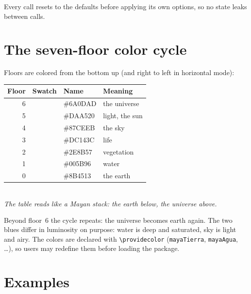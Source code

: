 \documentclass[11pt]{article}
\begin{document}
Every call resets to the defaults before applying its own options, so no
state leaks between calls.

\section{The seven-floor color cycle}

Floors are colored from the bottom up (and right to left in horizontal mode):

\begin{center}
	\begin{tabular}{rlll}
		\textbf{Floor} & \textbf{Swatch} & \textbf{Name} & \textbf{Meaning}\\\hline
		6 & \colorbox{mayaUniverso}{\strut\hspace{1em}} & \#6A0DAD & the universe\\
		5 & \colorbox{mayaSol}{\strut\hspace{1em}} & \#DAA520 & light, the sun\\
		4 & \colorbox{mayaCielo}{\strut\hspace{1em}} & \#87CEEB & the sky\\
		3 & \colorbox{mayaVida}{\strut\hspace{1em}} & \#DC143C & life\\
		2 & \colorbox{mayaVegetacion}{\strut\hspace{1em}} & \#2E8B57 & vegetation\\
		1 & \colorbox{mayaAgua}{\strut\hspace{1em}} & \#005B96 & water\\
		0 & \colorbox{mayaTierra}{\strut\hspace{1em}} & \#8B4513 & the earth\\
	\end{tabular}\\[4pt]
	\emph{The table reads like a Mayan stack: the earth below, the universe above.}
\end{center}

\noindent Beyond floor~6 the cycle repeats: the universe becomes earth again.
The two blues differ in luminosity on purpose: water is deep and saturated,
sky is light and airy. The colors are declared with \verb|\providecolor|
(\texttt{mayaTierra}, \texttt{mayaAgua}, \dots), so users may redefine them
before loading the package.

\section{Examples}
\end{document}
